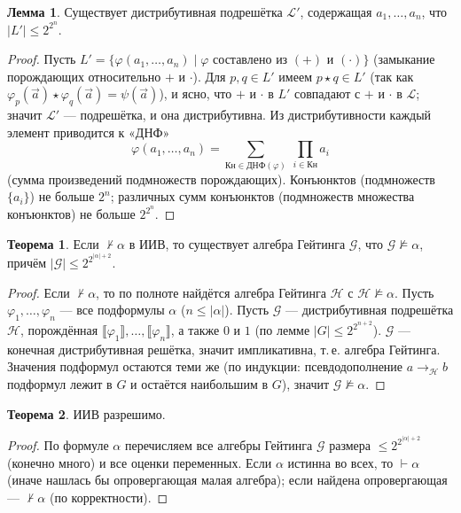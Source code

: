 \documentclass[11pt,a4paper]{article}
\newcommand{\vd}{\vdash}
\newcommand{\nvd}{\nvdash}
\newcommand{\sem}[1]{\llbracket #1\rrbracket}
\theoremstyle{definition}
\newtheorem*{thm}{Теорема}
\newtheorem*{lmm}{Лемма}
\begin{document}
\begin{lmm}
Существует дистрибутивная подрешётка $\mathcal{L}'$, содержащая $a_1,\dots,a_n$, что $|L'|\le2^{2^n}$.
\end{lmm}
\begin{proof}
Пусть $L'=\{\varphi(a_1,\dots,a_n)\mid\varphi$ составлено из $(+)$ и $(\cdot)\}$ (замыкание порождающих относительно $+$ и $\cdot$). Для $p,q\in L'$ имеем $p\star q\in L'$ (так как $\varphi_p(\vec a)\star\varphi_q(\vec a)=\psi(\vec a)$), и ясно, что $+$ и $\cdot$ в $L'$ совпадают с $+$ и $\cdot$ в $\mathcal{L}$; значит $\mathcal{L}'$ --- подрешётка, и она дистрибутивна. Из дистрибутивности каждый элемент приводится к «ДНФ»
\[
\varphi(a_1,\dots,a_n)=\sum_{\text{Кн}\in\text{ДНФ}(\varphi)}\ \prod_{i\in\text{Кн}}a_i
\]
(сумма произведений подмножеств порождающих). Конъюнктов (подмножеств $\{a_i\}$) не больше $2^n$; различных сумм конъюнктов (подмножеств множества конъюнктов) не больше $2^{2^n}$.
\end{proof}

\begin{thm}
Если $\nvd\alpha$ в ИИВ, то существует алгебра Гейтинга $\mathcal{G}$, что $\mathcal{G}\not\models\alpha$, причём $|\mathcal{G}|\le2^{2^{|\alpha|+2}}$.
\end{thm}
\begin{proof}
Если $\nvd\alpha$, то по полноте найдётся алгебра Гейтинга $\mathcal{H}$ с $\mathcal{H}\not\models\alpha$. Пусть $\varphi_1,\dots,\varphi_n$ --- все подформулы $\alpha$ ($n\le|\alpha|$). Пусть $\mathcal{G}$ --- дистрибутивная подрешётка $\mathcal{H}$, порождённая $\sem{\varphi_1},\dots,\sem{\varphi_n}$, а также $0$ и $1$ (по лемме $|G|\le2^{2^{n+2}}$). $\mathcal{G}$ --- конечная дистрибутивная решётка, значит импликативна, т.\,е. алгебра Гейтинга. Значения подформул остаются теми же (по индукции: псевдодополнение $a\to_{\mathcal H}b$ подформул лежит в $G$ и остаётся наибольшим в $G$), значит $\mathcal{G}\not\models\alpha$.
\end{proof}
\begin{thm}
ИИВ разрешимо.
\end{thm}
\begin{proof}
По формуле $\alpha$ перечисляем все алгебры Гейтинга $\mathcal{G}$ размера $\le2^{2^{|\alpha|+2}}$ (конечно много) и все оценки переменных. Если $\alpha$ истинна во всех, то $\vd\alpha$ (иначе нашлась бы опровергающая малая алгебра); если найдена опровергающая --- $\nvd\alpha$ (по корректности).
\end{proof}
\end{document}
